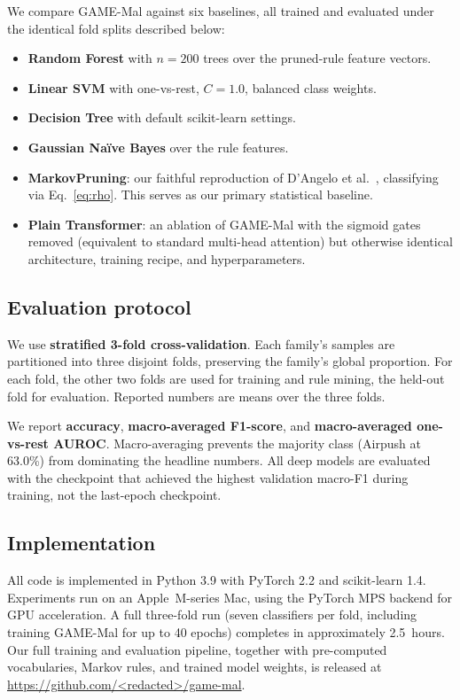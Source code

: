 We compare GAME-Mal against six baselines, all trained and
evaluated under the identical fold splits described below:

\begin{itemize}
  \item \textbf{Random Forest} with $n=200$ trees over the
    pruned-rule feature vectors.
  \item \textbf{Linear SVM} with one-vs-rest, $C=1.0$, balanced
    class weights.
  \item \textbf{Decision Tree} with default scikit-learn settings.
  \item \textbf{Gaussian Naïve Bayes} over the rule features.
  \item \textbf{MarkovPruning}: our faithful reproduction of
    D'Angelo et al.~\cite{dangelo2023association}, classifying via
    Eq.~\ref{eq:rho}. This serves as our primary statistical
    baseline.
  \item \textbf{Plain Transformer}: an ablation of GAME-Mal with
    the sigmoid gates removed (equivalent to standard multi-head
    attention) but otherwise identical architecture, training
    recipe, and hyperparameters.
\end{itemize}

\subsection{Evaluation protocol}

We use \textbf{stratified 3-fold cross-validation}. Each family's
samples are partitioned into three disjoint folds, preserving the
family's global proportion. For each fold, the other two folds
are used for training and rule mining, the held-out fold for
evaluation. Reported numbers are means over the three folds.

We report \textbf{accuracy}, \textbf{macro-averaged F1-score},
and \textbf{macro-averaged one-vs-rest AUROC}. Macro-averaging
prevents the majority class (Airpush at 63.0\%) from dominating
the headline numbers. All deep models are evaluated with the
checkpoint that achieved the highest validation macro-F1 during
training, not the last-epoch checkpoint.

\subsection{Implementation}

All code is implemented in Python 3.9 with PyTorch 2.2 and
scikit-learn 1.4. Experiments run on an Apple~M-series Mac,
using the PyTorch MPS backend for GPU acceleration. A full
three-fold run (seven classifiers per fold, including training
GAME-Mal for up to 40 epochs) completes in approximately
2.5~hours. Our full training and evaluation pipeline, together
with pre-computed vocabularies, Markov rules, and trained model
weights, is released at \url{https://github.com/<redacted>/game-mal}.
